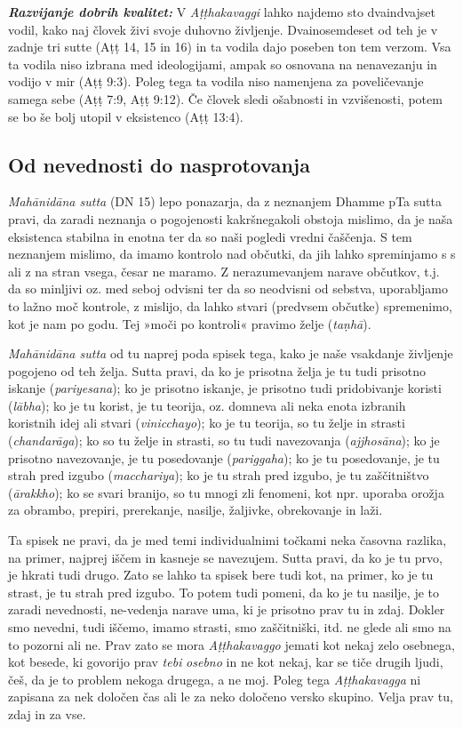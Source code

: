 \textbf{\emph{Razvijanje dobrih kvalitet:}} V \emph{Aṭṭhakavaggi} lahko
najdemo sto dvaindvajset vodil, kako naj človek živi svoje duhovno
življenje. Dvainosemdeset od teh je v zadnje tri sutte (Aṭṭ 14, 15 in
16) in ta vodila dajo poseben ton tem verzom. Vsa ta vodila niso izbrana
med ideologijami, ampak so osnovana na nenavezanju in vodijo v mir (Aṭṭ
9:3). Poleg tega ta vodila niso namenjena za poveličevanje samega sebe
(Aṭṭ 7:9, Aṭṭ 9:12). Če človek sledi ošabnosti in vzvišenosti, potem se
bo še bolj utopil v eksistenco (Aṭṭ 13:4).

\subsection{Od nevednosti do nasprotovanja}

\emph{Mahānidāna sutta} (DN 15) lepo ponazarja, da z neznanjem Dhamme
pTa sutta pravi, da zaradi neznanja o pogojenosti kakršnegakoli obstoja
mislimo, da je naša eksistenca stabilna in enotna ter da so naši pogledi
vredni čaščenja. S tem neznanjem mislimo, da imamo kontrolo nad občutki,
da jih lahko spreminjamo s s ali z na stran vsega, česar ne maramo. Z
nerazumevanjem narave občutkov, t.j. da so minljivi oz. med seboj
odvisni ter da so neodvisni od sebstva, uporabljamo to lažno moč
kontrole, z mislijo, da lahko stvari (predvsem občutke) spremenimo, kot
je nam po godu. Tej »moči po kontroli« pravimo želje (\emph{taṇhā}).

\emph{Mahānidāna sutta} od tu naprej poda spisek tega, kako je naše
vsakdanje življenje pogojeno od teh želja. Sutta pravi, da ko je
prisotna želja je tu tudi prisotno iskanje (\emph{pariyesana}); ko je
prisotno iskanje, je prisotno tudi pridobivanje koristi (\emph{lābha});
ko je tu korist, je tu teorija, oz. domneva ali neka enota izbranih
koristnih idej ali stvari (\emph{vinicchayo}); ko je tu teorija, so tu
želje in strasti (\emph{chandarāga}); ko so tu želje in strasti, so tu
tudi navezovanja (\emph{ajjhosāna}); ko je prisotno navezovanje, je tu
posedovanje (\emph{pariggaha}); ko je tu posedovanje, je tu strah pred
izgubo (\emph{macchariya}); ko je tu strah pred izgubo, je tu
zaščitništvo (\emph{ārakkho}); ko se svari branijo, so tu mnogi zli
fenomeni, kot npr. uporaba orožja za obrambo, prepiri, prerekanje,
nasilje, žaljivke, obrekovanje in laži.

Ta spisek ne pravi, da je med temi individualnimi točkami neka časovna
razlika, na primer, najprej iščem in kasneje se navezujem. Sutta pravi,
da ko je tu prvo, je hkrati tudi drugo. Zato se lahko ta spisek bere
tudi kot, na primer, ko je tu strast, je tu strah pred izgubo. To potem
tudi pomeni, da ko je tu nasilje, je to zaradi nevednosti, ne-vedenja
narave uma, ki je prisotno prav tu in zdaj. Dokler smo nevedni, tudi
iščemo, imamo strasti, smo zaščitniški, itd. ne glede ali smo na to
pozorni ali ne. Prav zato se mora \emph{Aṭṭhakavaggo} jemati kot nekaj
zelo osebnega, kot besede, ki govorijo prav \emph{tebi} \emph{osebno} in
ne kot nekaj, kar se tiče drugih ljudi, češ, da je to problem nekoga
drugega, a ne moj. Poleg tega \emph{Aṭṭhakavagga} ni zapisana za nek
določen čas ali le za neko določeno versko skupino. Velja prav tu, zdaj
in za vse.

